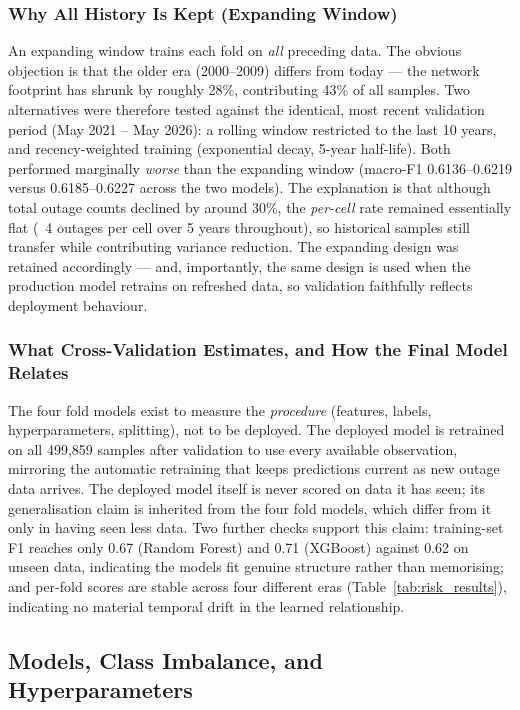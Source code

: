 \subsubsection{Why All History Is Kept (Expanding Window)}

An expanding window trains each fold on \emph{all} preceding data. The obvious objection is that the older era (2000--2009) differs from today --- the network footprint has shrunk by roughly 28\%, contributing 43\% of all samples. Two alternatives were therefore tested against the identical, most recent validation period (May 2021 -- May 2026): a rolling window restricted to the last 10 years, and recency-weighted training (exponential decay, 5-year half-life). Both performed marginally \emph{worse} than the expanding window (macro-F1 0.6136--0.6219 versus 0.6185--0.6227 across the two models). The explanation is that although total outage counts declined by around 30\%, the \emph{per-cell} rate remained essentially flat (~4 outages per cell over 5 years throughout), so historical samples still transfer while contributing variance reduction. The expanding design was retained accordingly --- and, importantly, the same design is used when the production model retrains on refreshed data, so validation faithfully reflects deployment behaviour.

\subsubsection{What Cross-Validation Estimates, and How the Final Model Relates}

The four fold models exist to measure the \emph{procedure} (features, labels, hyperparameters, splitting), not to be deployed. The deployed model is retrained on all 499,859 samples after validation to use every available observation, mirroring the automatic retraining that keeps predictions current as new outage data arrives. The deployed model itself is never scored on data it has seen; its generalisation claim is inherited from the four fold models, which differ from it only in having seen less data. Two further checks support this claim: training-set F1 reaches only 0.67 (Random Forest) and 0.71 (XGBoost) against 0.62 on unseen data, indicating the models fit genuine structure rather than memorising; and per-fold scores are stable across four different eras (Table~\ref{tab:risk_results}), indicating no material temporal drift in the learned relationship.

\subsection{Models, Class Imbalance, and Hyperparameters}

